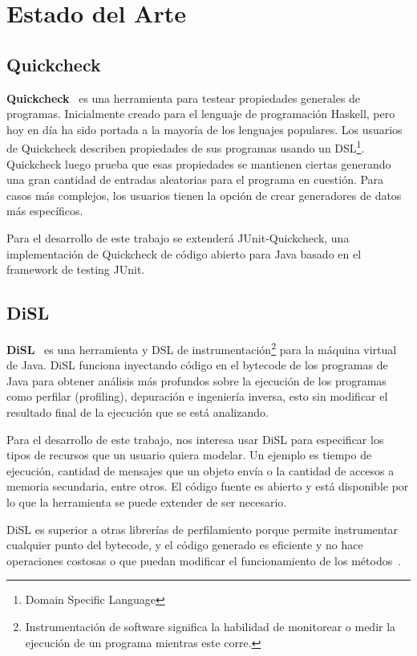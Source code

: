 \section{Estado del Arte}\label{chap:eoa}

\subsection*{Quickcheck}
\textbf{Quickcheck}~\cite{Claessen:2011:QLT:1988042.1988046} es una herramienta para
testear propiedades generales de programas.
Inicialmente creado para el lenguaje de programación Haskell, pero hoy en día
ha sido portada a la mayoría de los lenguajes populares.
Los usuarios de Quickcheck describen propiedades de sus programas usando
un DSL\footnote{Domain Specific Language}. Quickcheck luego prueba que esas
propiedades se mantienen ciertas generando una gran cantidad de entradas
aleatorias para el programa en cuestión.
Para casos más complejos, los usuarios tienen la opción de crear generadores de
datos más específicos.

Para el desarrollo de este trabajo se extenderá JUnit-Quickcheck, una
implementación de Quickcheck de código abierto para Java basado en el
framework de testing JUnit.

\subsection*{DiSL}
\textbf{DiSL}~\cite{Marek:2012:DDL:2162049.2162077} es una herramienta y DSL de
instrumentación\footnote{Instrumentación de software significa la habilidad de monitorear o medir la
ejecución de un programa mientras este corre.} para la máquina virtual de Java.
DiSL funciona inyectando código en el bytecode de los programas de Java para obtener análisis
más profundos sobre la ejecución de los programas como perfilar (profiling),
depuración e ingeniería inversa, esto sin modificar el resultado final de la
ejecución que se está analizando.

Para el desarrollo de este trabajo, nos interesa usar DiSL para especificar los
tipos de recursos que un usuario quiera modelar. Un ejemplo es tiempo de
ejecución, cantidad de mensajes que un objeto envía o la cantidad de accesos a
memoria secundaria, entre otros.
El código fuente es abierto y está disponible por lo que la herramienta se
puede extender de ser necesario.

DiSL es superior a otras librerías de perfilamiento porque permite instrumentar
cualquier punto del bytecode, y el código generado es eficiente y no hace
operaciones costosas o que puedan modificar el funcionamiento de los
métodos~\cite{10.1007/978-3-642-35182-2_18}.
